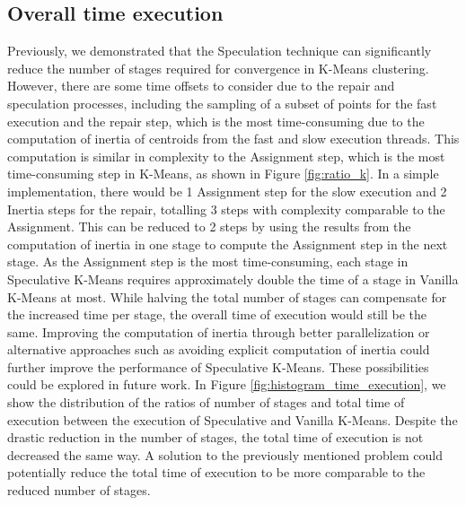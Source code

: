 \subsection{Overall time execution}

Previously, we demonstrated that the Speculation technique can significantly reduce the number of stages required for convergence in K-Means clustering. However, there are some time offsets to consider due to the repair and speculation processes, including the sampling of a subset of points for the fast execution and the repair step, which is the most time-consuming due to the computation of inertia of centroids from the fast and slow execution threads. This computation is similar in complexity to the Assignment step, which is the most time-consuming step in K-Means, as shown in Figure \ref{fig:ratio_k}.
In a simple implementation, there would be 1 Assignment step for the slow execution and 2 Inertia steps for the repair, totalling 3 steps with complexity comparable to the Assignment. This can be reduced to 2 steps by using the results from the computation of inertia in one stage to compute the Assignment step in the next stage.
As the Assignment step is the most time-consuming, each stage in Speculative K-Means requires approximately double the time of a stage in Vanilla K-Means at most. While halving the total number of stages can compensate for the increased time per stage, the overall time of execution would still be the same. Improving the computation of inertia through better parallelization or alternative approaches such as avoiding explicit computation of inertia could further improve the performance of Speculative K-Means. These possibilities could be explored in future work.
In Figure \ref{fig:histogram_time_execution}, we show the distribution of the ratios of number of stages and total time of execution between the execution of Speculative and Vanilla K-Means. Despite the drastic reduction in the number of stages, the total time of execution is not decreased the same way. A solution to the previously mentioned problem could potentially reduce the total time of execution to be more comparable to the reduced number of stages.

